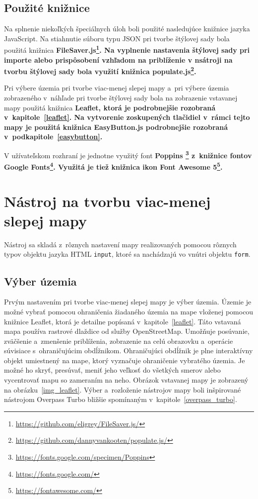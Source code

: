 \subsection*{Použité knižnice}
Na splnenie niekoľkých špeciálnych úloh boli použité nasledujúce knižnice jazyka JavaScript. Na stiahnutie súboru typu JSON pri tvorbe štýlovej sady bola použitá knižnica \bf FileSaver.js\rm\footnote{\url{https://github.com/eligrey/FileSaver.js/}}. Na vyplnenie nastavenia štýlovej sady pri importe alebo prispôsobení vzhľadom na priblíženie v nsátroji na tvorbu štýlovej sady bola využití knižnica \bf populate.js\rm\footnote{\url{https://github.com/dannyvankooten/populate.js/}}. 

Pri výbere územia pri tvorbe viac-menej slepej mapy a~pri výbere územia zobrazeného v~náhľade pri tvorbe štýlovej sady bola na zobrazenie vstavanej mapy použitá knižnica \bf Leaflet\rm, ktorá je podrobnejšie rozobraná v~kapitole~\ref{leaflet}. Na vytvorenie zoskupených tlačidiel v~rámci tejto mapy je použitá knižnica \bf EasyButton.js \rm podrobnejšie rozobraná v~podkapitole~\ref{easybutton}.

V užívateľskom rozhraní je jednotne využitý font \bf Poppins \rm\footnote{\url{https://fonts.google.com/specimen/Poppins}} z~knižnice fontov \bf Google Fonts\rm\footnote{\url{https://fonts.google.com/}}. Využitá je tiež knižnica ikon \bf Font Awesome 5\rm\footnote{\url{https://fontawesome.com/}}.

\section{Nástroj na tvorbu viac-menej slepej mapy}
Nástroj sa skladá z~rôznych nastavení mapy realizovaných pomocou rôznych typov objektu jazyka HTML {\tt input}, ktoré sa nachádzajú vo vnútri objektu {\tt form}.

\subsection*{Výber územia}
\label{embed_map}
Prvým nastavením pri tvorbe viac-menej slepej mapy je výber územia. Územie je možné vybrať pomocou ohraničenia žiadaného územia na mape vloženej pomocou knižnice Leaflet, ktorá je detailne popísaná v~kapitole~\ref{leaflet}. Táto vstavaná mapa používa rastrové dlaždice od služby OpenStreetMap. Umožňuje posúvanie, zväčšenie a~zmenšenie priblíženia, zobrazenie na celú obrazovku a~operácie súvisiace s~ohraničujúcim obdĺžnikom. Ohraničujúci obdĺžnik je plne interaktívny objekt umiestnený na mape, ktorý vyznačuje ohraničenie vybratého územia. Je možné ho skryť, presúvať, meniť jeho veľkosť do všetkých smerov alebo vycentrovať mapu so zameraním na neho. Obrázok vstavanej mapy je zobrazený na obrázku~\ref{img_leaflet}. Výber a~rozloženie nástrojov mapy boli inšpirované nástrojom Overpass Turbo bližšie spomínaným v~kapitole~\ref{overpass_turbo}.

